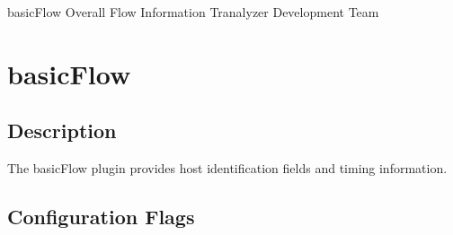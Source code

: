 \documentclass[documentation]{subfiles}
\begin{document}
\trantitle
    {basicFlow}
    {Overall Flow Information}
    {Tranalyzer Development Team} %

\section{basicFlow}\label{s:basicFlow}

\subsection{Description}
The basicFlow plugin provides host identification fields and timing information.

\subsection{Configuration Flags}
\end{document}
